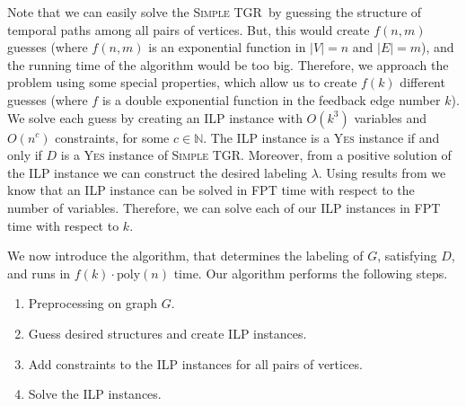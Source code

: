 \documentclass[11pt,a4paper]{article}
\theoremstyle{remark}
\theoremstyle{definition}
\newcommand{\deltaExact}{\textsc{Simple TGR}}
\begin{document}
Note that we can easily solve the \deltaExact\ by guessing the structure of temporal paths among all pairs of vertices.
But, this would create $f(n,m)$ guesses (where $f(n,m)$ is an exponential function in $|V|=n$ and $|E| = m$), and the running time of the algorithm would be too big.
Therefore, we approach the problem using some special properties, which allow us to create $f(k)$ different guesses (where $f$ is a double exponential function in the feedback edge number $k$).
We solve each guess by creating an ILP instance with $O(k^3)$ variables and $O(n^c)$ constraints, for some $c \in \mathbb{N}$.
The ILP instance is a \textsc{Yes} instance if and only if $D$ is a \textsc{Yes} instance of \deltaExact.
Moreover, from a positive solution of the ILP instance we can construct the desired labeling $\lambda$.
Using results from \cite{Lenstra1983Integer} we know that an ILP instance can be solved in FPT time with respect to the number of variables.
Therefore, we can solve each of our ILP instances in FPT time with respect to $k$.

We now introduce the algorithm, that determines the labeling of $G$, satisfying $D$, and runs in $f(k) \cdot \text{poly}(n)$ time.
Our algorithm performs the following steps.
\begin{enumerate}
    \item Preprocessing on graph $G$.
    \item Guess desired structures and create ILP instances.
    \item Add constraints to the ILP instances for all pairs of vertices.
    \item Solve the ILP instances.
\end{enumerate}
\end{document}
